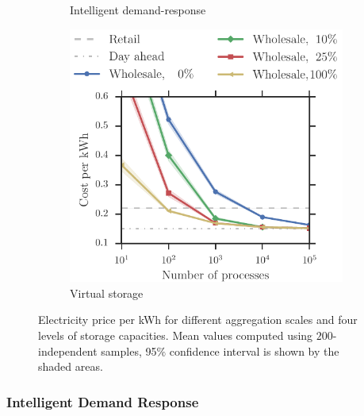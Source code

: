 \documentclass[conference]{IEEEtran}
\begin{document}
\begin{figure}[t!]
\begin{subfigure}[b]{0.32\textwidth}
        \caption{Intelligent demand-response}
       \label{fig:wholesale_flex}
    \end{subfigure}
    \begin{subfigure}[b]{0.32\textwidth}
        \includegraphics[width=1.0\textwidth, clip=true, trim=0 0 0 2cm]{figures/Wholesale_betweenDay.pdf}
        \caption{Virtual storage}
        \label{fig:wholesale_betweenDay}
    \end{subfigure}
    \vspace{-0.4cm}
\caption{Electricity price per kWh for different aggregation scales and four levels of storage capacities. Mean values computed using $200$-independent samples, 95$\%$ confidence interval is shown by the shaded areas.}
\end{figure}

\subsubsection{Intelligent Demand Response}
\end{document}
